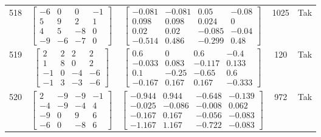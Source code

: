 \documentclass[a4paper,12pt]{article}
\begin{document}
\begin{tabular}{c c c c c}
518
&
$\begin{bmatrix} -6 & 0 & 0 & -1 \\ 5 & 9 & 2 & 1 \\ 4 & 5 & -8 & 0 \\ -9 & -6 & -7 & 0 \end{bmatrix}$
&
$\begin{bmatrix} -0.081 & -0.081 & 0.05 & -0.08 \\ 0.098 & 0.098 & 0.024 & 0 \\ 0.02 & 0.02 & -0.085 & -0.04 \\ -0.514 & 0.486 & -0.299 & 0.48 \end{bmatrix}$
&
1025
&
Tak
\\
519
&
$\begin{bmatrix} 2 & 2 & 2 & 2 \\ 1 & 8 & 0 & 2 \\ -1 & 0 & -4 & -6 \\ -1 & 3 & -3 & -6 \end{bmatrix}$
&
$\begin{bmatrix} 0.6 & 0 & 0.6 & -0.4 \\ -0.033 & 0.083 & -0.117 & 0.133 \\ 0.1 & -0.25 & -0.65 & 0.6 \\ -0.167 & 0.167 & 0.167 & -0.333 \end{bmatrix}$
&
120
&
Tak
\\
520
&
$\begin{bmatrix} 2 & -9 & -9 & -1 \\ -4 & -9 & -4 & 4 \\ -9 & 0 & 9 & 6 \\ -6 & 0 & -8 & 6 \end{bmatrix}$
&
$\begin{bmatrix} -0.944 & 0.944 & -0.648 & -0.139 \\ -0.025 & -0.086 & -0.008 & 0.062 \\ -0.167 & 0.167 & -0.056 & -0.083 \\ -1.167 & 1.167 & -0.722 & -0.083 \end{bmatrix}$
&
972
&
Tak
\\
\end{tabular} \egroup \newpage
\end{document}
